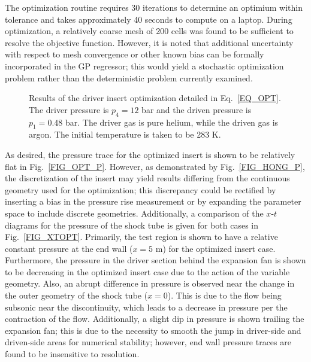 The optimization routine requires 30 iterations to determine an optimium within tolerance and takes approximately 40 seconds to compute on a laptop. During optimization, a relatively coarse mesh of 200 cells was found to be sufficient to resolve the objective function. However, it is noted that additional uncertainty with respect to mesh convergence or other known bias can be formally incorporated in the GP regressor; this would yield a stochastic optimization problem rather than the deterministic problem currently examined.   

\begin{figure}[!ht!]
	\centering
	\caption{\label{FIG_OPT} Results of the driver insert optimization detailed in Eq.~\ref{EQ_OPT}. The driver pressure is $p_4=12$ bar and the driven pressure is $p_1=0.48$ bar. The driver gas is pure helium, while the driven gas is argon. The initial temperature is taken to be 283 K.}
\end{figure}

As desired, the pressure trace for the optimized insert is shown to be relatively flat in Fig.~\ref{FIG_OPT_P}. However, as demonstrated by Fig.~\ref{FIG_HONG_P}, the discretization of the insert may yield results differing from the continuous geometry used for the optimization; this discrepancy could be rectified by inserting a bias in the pressure rise measurement or by expanding the parameter space to include discrete geometries. Additionally, a comparison of the $x$-$t$ diagrams for the pressure of the shock tube is given for both cases in Fig.~\ref{FIG_XTOPT}. Primarily, the test region is shown to have a relative constant pressure at the end wall ($x=5$ m) for the optimized insert case. Furthermore, the pressure in the driver section behind the expansion fan is shown to be decreasing in the optimized insert case due to the action of the variable geometry. Also, an abrupt difference in pressure is observed near the change in the outer geometry of the shock tube ($x=0$). This is due to the flow being subsonic near the discontinuity, which leads to a decrease in pressure per the contraction of the flow. Additionally, a slight dip in pressure is shown trailing the expansion fan; this is due to the necessity to smooth the jump in driver-side and driven-side areas for numerical stability; however, end wall pressure traces are found to be insensitive to resolution.

